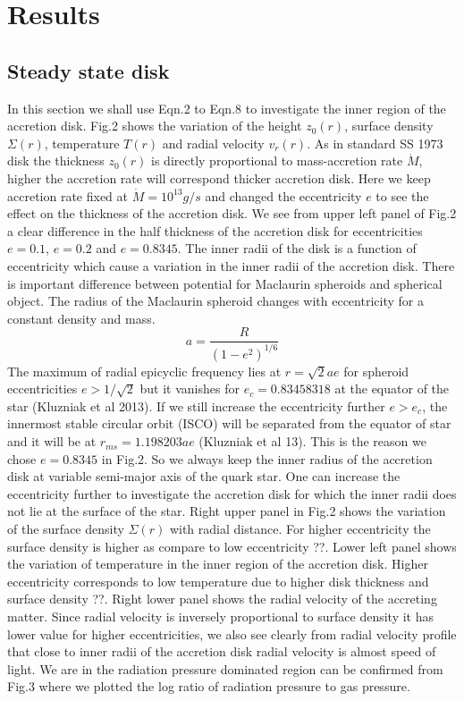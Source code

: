 \documentclass[useAMS,usenatbib]{mn2e}
\begin{document}
\section{Results}
\subsection{Steady state disk}
In this section we shall use Eqn.2 to Eqn.8 to investigate the inner region of the accretion disk. Fig.2 shows the variation of the height $z_0(r)$, surface density $\Sigma(r)$, temperature $T(r)$ and radial velocity $v_r(r)$. As in standard SS 1973 disk the thickness $z_0(r)$ is directly proportional to mass-accretion rate $\dot{M}$, higher the accretion rate will correspond thicker accretion disk. Here we keep accretion rate fixed at $\dot{M} = 10^{13} g/s$ and changed the eccentricity $e$ to see the effect on the thickness of the accretion disk. We see from upper left panel of Fig.2 a clear difference in the half thickness of the accretion disk for eccentricities $e =0.1$, $e = 0.2$ and $e = 0.8345$. The inner radii of the disk is a function of eccentricity which cause a variation in the inner radii of the accretion disk. There is important difference between potential for Maclaurin spheroids and spherical object. The radius of the Maclaurin spheroid changes with eccentricity for a constant density and mass. 
\begin{equation}
a = \frac{R}{(1 - e^2)^{1/6}}
\end{equation}
The maximum of radial epicyclic frequency lies at $r = \sqrt{2}ae$ for spheroid eccentricities $e>1/\sqrt{2}$ but it vanishes for $e_c = 0.83458318$ at the equator of the star (Kluzniak et al 2013). If we still increase the eccentricity further $e>e_c$, the innermost stable circular orbit (ISCO) will be separated from the equator of star and it will be at $r_{ms} = 1.198203ae$ (Kluzniak et al 13). This is the reason we chose $e = 0.8345$ in Fig.2. So we always keep the inner radius of the accretion disk at variable semi-major axis of the quark star. One can increase the eccentricity further to investigate the accretion disk for which the inner radii does not lie at the surface of the star. Right upper panel in Fig.2 shows the variation of the surface density $\Sigma(r)$ with radial distance. For higher eccentricity the surface density is higher as compare to low eccentricity ??. Lower left panel shows the variation of temperature in the inner region of the accretion disk. Higher eccentricity corresponds to low temperature due to higher disk thickness and surface density ??. Right lower panel shows the radial velocity of the accreting matter. Since radial velocity is inversely proportional to surface density it has lower value for higher eccentricities, we also see clearly from radial velocity profile that close to inner radii of the accretion disk radial velocity is almost speed of light. We are in the radiation pressure dominated region can be confirmed from Fig.3 where we plotted the log ratio of radiation pressure to gas pressure.
\end{document}
